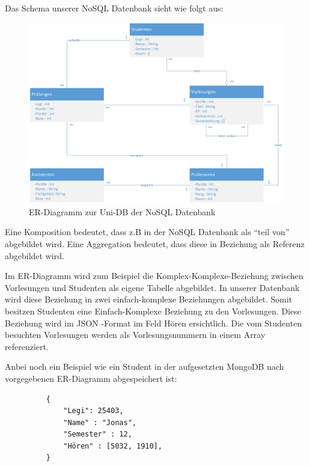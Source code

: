 \newpage
Das Schema unserer NoSQL Datenbank sieht wie folgt aus:
\begin{figure}[h] 
	\centering
		\includegraphics[width=1\textwidth]{./pictures/NoSQL-DB_ER_Diagramm_UNI-DB.png}
	\caption{ER-Diagramm zur Uni-DB der NoSQL Datenbank}
	\label{fig:uni-dbNoSQL}
\end{figure}

Eine Komposition bedeutet, dass z.B in der NoSQL Datenbank als ``teil von''
abgebildet wird. Eine Aggregation bedeutet, dass diese in Beziehung  als
Referenz abgebildet wird.

Im ER-Diagramm wird zum Beispiel die Komplex-Komplexe-Beziehung zwischen 
Vorlesungen und Studenten als eigene Tabelle abgebildet. In unserer Datenbank
wird diese Beziehung in zwei einfach-komplexe Beziehungen abgebildet. Somit
besitzen Studenten eine Einfach-Komplexe Beziehung zu den Vorlesungen.
Diese Beziehung wird im JSON -Format im Feld Hören ersichtlich. Die vom
Studenten besuchten Vorlesungen werden als Vorlesungsnummern in einem Array
referenziert.

\newpage
\noindent
Anbei noch ein Beispiel wie ein Student in der aufgesetzten MongoDB nach vorgegebenen ER-Diagramm abgespeichert ist:
\begin{figure} [h]
	\begin{verbatim}
	{
		"Legi": 25403,
		"Name" : "Jonas",
		"Semester" : 12,
		"Hören" : [5032, 1910],
	}
	\end{verbatim}
	\label{cod:vorlesung}
\end{figure}



